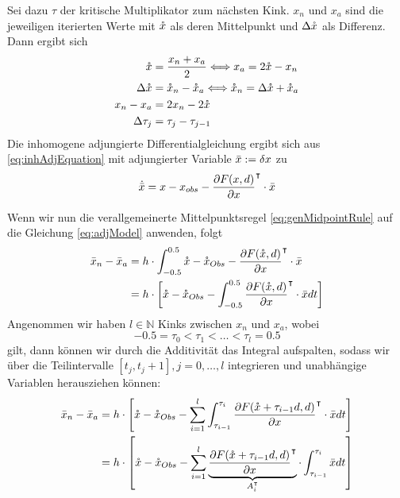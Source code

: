 Sei dazu $\tau$ der kritische Multiplikator zum nächsten Kink. $x_n$ und $x_a$ sind die jeweiligen iterierten Werte mit $\mathring{x}$ als deren Mittelpunkt und $\Delta \mathring{x}$ als Differenz. Dann ergibt sich 
\begin{align*}
\mathring{x} &= \frac{x_n+x_a}{2}\Longleftrightarrow x_a = 2\mathring{x} - x_n\\
\Delta \mathring{x} &= \mathring{x}_n - \mathring{x}_a \Longleftrightarrow \mathring{x}_n = \Delta \mathring{x} + \mathring{x}_a\\
x_n - x_a &= 2x_n - 2\mathring{x}\\
\Delta \tau_j&=\tau_j-\tau_{j-1}
\end{align*}
Die inhomogene adjungierte Differentialgleichung ergibt sich aus \eqref{eq:inhAdjEquation} mit adjungierter Variable $\bar{x} := \delta x$ zu
\begin{equation}
\dot{\bar{x}} = x - x_{obs} - \frac{\partial F(x,d)}{\partial x}^\intercal \cdot \bar{x}
\label{eq:adjModel}
\end{equation}

Wenn wir nun die verallgemeinerte Mittelpunktsregel \eqref{eq:genMidpointRule} auf die Gleichung \eqref{eq:adjModel} anwenden, folgt
\begin{align*}
\bar{x}_n - \bar{x}_a &= h\cdot \int_{-0.5}^{0.5}\mathring{x}-\mathring{x}_{Obs} - \frac{\partial F(\mathring{x},d)}{\partial x}^\intercal \cdot \bar{x}\\
									&= h\cdot \left[\mathring{x}-\mathring{x}_{Obs} - \int_{-0.5}^{0.5} \frac{\partial F(\mathring{x} ,d)}{\partial x}^\intercal \cdot \bar{x} dt\right]\\
\end{align*}
Angenommen wir haben $l \in \mathbb{N}$ Kinks zwischen $x_n$ und $x_{a}$, wobei \[-0.5 = \tau_0 <\tau_1 <\ldots < \tau_l=0.5\] gilt, dann können wir durch die Additivität das Integral aufspalten, sodass wir über die Teilintervalle $[t_j,t_j+1], j=0,\ldots,l$ integrieren und unabhängige Variablen herausziehen können:
\begin{align*}
\bar{x}_n - \bar{x}_a &= h\cdot \left[ \mathring{x}-\mathring{x}_{Obs} - \sum_{i=1}^l \int_{\tau_{i-1}}^{\tau_{i}}\frac{\partial F(\mathring{x}+\tau_{i-1}d,d)}{\partial x}^\intercal \cdot \bar{x} dt\right]\\
									&= h\cdot \left[\mathring{x} -\mathring{x}_{Obs} - \sum_{i=1}^l \underbrace{\frac{\partial F(\mathring{x}+\tau_{i-1}d,d)}{\partial x}^\intercal }_{A_i^\intercal} \cdot \int_{\tau_{i-1}}^{\tau_{i}} \bar{x} dt\right]\\
\end{align*}

